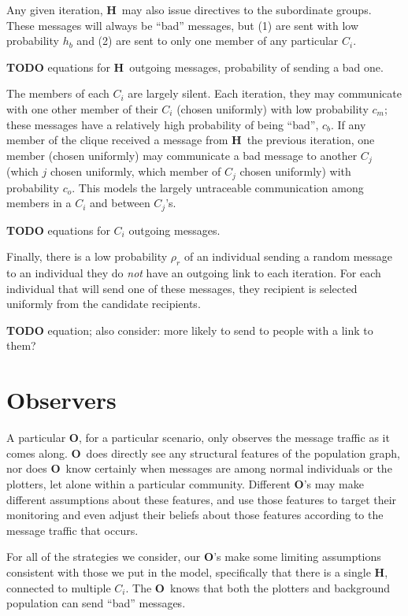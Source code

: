 \documentclass{article}
\newcommand{\Hub}[0]{\ensuremath{\mathbf{H}}}
\newcommand{\Obs}[0]{\ensuremath{\mathbf{O}}}
\begin{document}
Any given iteration, \Hub\ may also issue directives to the subordinate groups.  These messages will always be ``bad'' messages, but (1) are sent with low probability $h_b$ and (2) are sent to only one member of any particular $C_i$.

{\bf TODO} equations for \Hub\ outgoing messages, probability of sending a bad one.

The members of each $C_i$ are largely silent.  Each iteration, they may communicate with one other member of their $C_i$ (chosen uniformly) with low probability $c_m$; these messages have a relatively high probability of being ``bad'', $c_b$.  If any member of the clique received a message from \Hub\ the previous iteration, one member (chosen uniformly) may communicate a bad message to another $C_j$ (which $j$ chosen uniformly, which member of $C_j$ chosen uniformly) with probability $c_o$.  This models the largely untraceable communication among members in a $C_i$ and between $C_j$'s.

{\bf TODO} equations for $C_i$ outgoing messages.

Finally, there is a low probability $\rho_r$ of an individual sending a random message to an individual they do {\em not} have an outgoing link to each iteration. For each individual that will send one of these messages, they recipient is selected uniformly from the candidate recipients.

{\bf TODO} equation; also consider: more likely to send to people with a link to them?

\section*{Observers}
A particular \Obs, for a particular scenario, only observes the message traffic as it comes along.  \Obs\ does directly see any structural features of the population graph, nor does \Obs\ know certainly when messages are among normal individuals or the plotters, let alone within a particular community.  Different \Obs's may make different assumptions about these features, and use those features to target their monitoring and even adjust their beliefs about those features according to the message traffic that occurs.

For all of the strategies we consider, our \Obs's make some limiting assumptions consistent with those we put in the model, specifically that there is a single \Hub, connected to multiple $C_i$.  The \Obs\ knows that both the plotters and background population can send ``bad'' messages.
\end{document}
